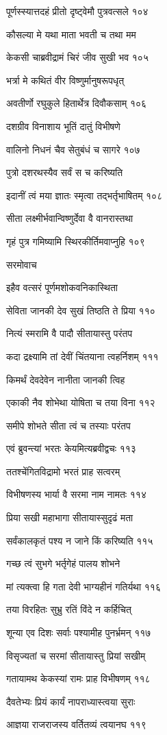 पूर्णस्स्यात्तदहं प्रीतो दृष्ट्वेमौ पुत्रवत्सले १०४

कौसल्या मे यथा माता भवती च तथा मम

केकसी चाब्रवीद्रामं चिरं जीव सुखी भव १०५

भर्त्रा मे कथितं वीर विष्णुर्मानुषरूपधृत्

अवतीर्णो रघुकुले हितार्थेत्र दिवौकसाम् १०६

दशग्रीव विनाशाय भूतिं दातुं विभीषणे

वालिनो निधनं चैव सेतुबंधं च सागरे १०७

पुत्रो दशरथस्यैव सर्वं स च करिष्यति

इदानीं त्वं मया ज्ञातः स्मृत्वा तद्भर्तृभाषितम् १०८

सीता लक्ष्मीर्भवान्विष्णुर्देवा वै वानरास्तथा

गृहं पुत्र गमिष्यामि स्थिरकीर्तिमवाप्नुहि १०९

सरमोवाच

इहैव वत्सरं पूर्णमशोकवनिकास्थिता

सेविता जानकी देव सुखं तिष्ठति ते प्रिया ११०

नित्यं स्मरामि वै पादौ सीतायास्तु परंतप

कदा द्रक्ष्यामि तां देवीं चिंतयाना त्वहर्निशम् १११

किमर्थं देवदेवेन नानीता जानकी त्विह

एकाकी नैव शोभेथा योषिता च तया विना ११२

समीपे शोभते सीता त्वं च तस्याः परंतप

एवं ब्रुवन्त्यां भरतः केयमित्यब्रवीद्वचः ११३

ततश्चेंगितविद्रामो भरतं प्राह सत्वरम्

विभीषणस्य भार्या वै सरमा नाम नामतः ११४

प्रिया सखी महाभागा सीतायास्सुदृढं मता

सर्वंकालकृतं पश्य न जाने किं करिष्यति ११५

गच्छ त्वं सुभगे भर्तृगेहं पालय शोभने

मां त्यक्त्वा हि गता देवी भाग्यहीनं गतिर्यथा ११६

तया विरहितः सुभ्रु रतिं विंदे न कर्हिचित्

शून्या एव दिशः सर्वाः पश्यामीह पुनर्भ्रमन् ११७

विसृज्यतां च सरमां सीतायास्तु प्रियां सखीम्

गतायामथ केकस्यां रामः प्राह विभीषणम् ११८

दैवतेभ्यः प्रियं कार्यं नापराध्यास्त्वया सुराः

आज्ञया राजराजस्य वर्तितव्यं त्वयानघ ११९

